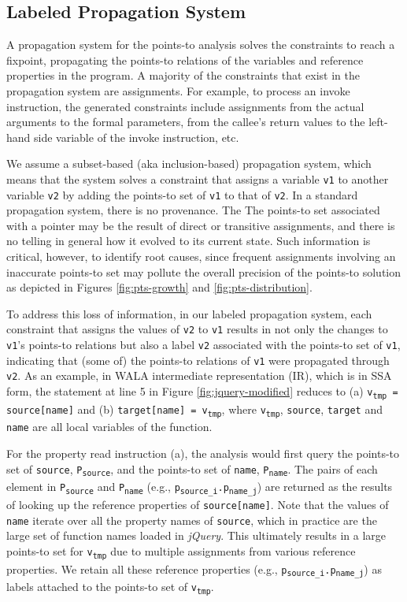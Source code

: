 \subsection{Labeled Propagation System}

A propagation system for the points-to analysis solves the constraints to reach a fixpoint, propagating the points-to relations of the variables and reference properties in the program. A majority of the constraints that exist in the propagation system are assignments. For example, to process an invoke instruction, the generated constraints include assignments from the actual arguments to the formal parameters, from the callee's return values to the left-hand side variable of the invoke instruction, etc. 

We assume a subset-based (aka inclusion-based) propagation system, which means that the system solves a constraint that assigns a variable {\tt v1} to another variable {\tt v2} by adding the points-to set of {\tt v1} to that of {\tt v2}. In a standard propagation system, there is no provenance. The The points-to set associated with a pointer may be the result of direct or transitive assignments, and there is no telling in general how it evolved to its current state. Such information is critical, however, to identify root causes, since frequent assignments involving an inaccurate points-to set may pollute the overall precision of the points-to solution as depicted in Figures \ref{fig:pts-growth} and \ref{fig:pts-distribution}.

To address this loss of information, in our labeled propagation system, each constraint that assigns the values of {\tt v2} to {\tt v1} results in not only the changes to {\tt v1}'s points-to relations but also a label {\tt v2} associated with the points-to set of {\tt v1}, indicating that (some of) the points-to relations of {\tt v1} were propagated through {\tt v2}. As an example, in WALA intermediate representation (IR), which is in SSA form, the statement at line 5 in Figure \ref{fig:jquery-modified} reduces to (a) {\tt v\textsubscript{tmp} = source[name]} and (b) {\tt target[name] = v\textsubscript{tmp}}, where {\tt v\textsubscript{tmp}}, {\tt source}, {\tt target} and {\tt name} are all local variables of the function.  

For the property read instruction (a), the analysis would first query the points-to set of {\tt source}, {\tt P\textsubscript{source}}, and the points-to set of {\tt name}, {\tt P\textsubscript{name}}. The pairs of each element in {\tt P\textsubscript{source}} and {\tt P\textsubscript{name}} (e.g., {\tt p\textsubscript{source\_i}.p\textsubscript{name\_j}}) are returned as the results of looking up the reference properties of {\tt source[name]}. Note that the values of {\tt name} iterate over all the property names of {\tt source}, which in practice are the large set of function names loaded in {\it jQuery}. This ultimately results in a large points-to set for {\tt v\textsubscript{tmp}} due to multiple assignments from various reference properties. We retain all these reference properties (e.g., {\tt p\textsubscript{source\_i}.p\textsubscript{name\_j}}) as labels attached to the points-to set of {\tt v\textsubscript{tmp}}. 

